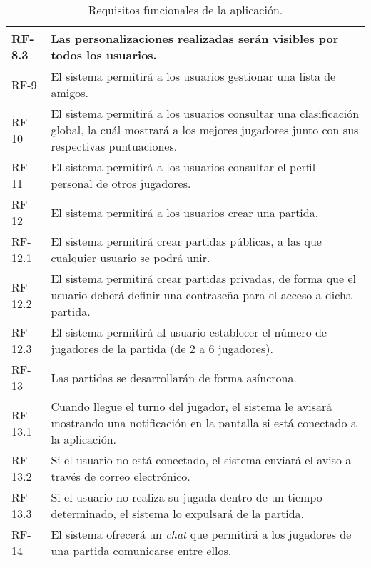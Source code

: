 \documentclass[11pt, a4paper, titlepage]{article}
\begin{document}
\begin{table}[h!]
\begin{tabularx}{\textwidth}{|l|X|}
         \hline
         RF-8.3 & Las personalizaciones realizadas serán visibles por todos los usuarios.\\
         \hline
         RF-9 & El sistema permitirá a los usuarios gestionar una lista de amigos.\\
         \hline
         RF-10 & El sistema permitirá a los usuarios consultar una clasificación global, la cuál mostrará a los mejores jugadores junto con sus respectivas puntuaciones.\\
         \hline
         RF-11 & El sistema permitirá a los usuarios consultar el perfil personal de otros jugadores.\\
         \hline
         RF-12 & El sistema permitirá a los usuarios crear una partida.\\
         \hline
         RF-12.1 & El sistema permitirá crear partidas públicas, a las que cualquier usuario se podrá unir.\\
         \hline
         RF-12.2 & El sistema permitirá crear partidas privadas, de forma que el usuario deberá definir una contraseña para el acceso a dicha partida.\\
         \hline
         RF-12.3 & El sistema permitirá al usuario establecer el número de jugadores de la partida (de 2 a 6 jugadores).\\
         \hline
         RF-13 & Las partidas se desarrollarán de forma asíncrona.\\
         \hline
         RF-13.1 & Cuando llegue el turno del jugador, el sistema le avisará mostrando una notificación en la pantalla si está conectado a la aplicación.\\
         \hline
         RF-13.2 & Si el usuario no está conectado, el sistema enviará el aviso a través de correo electrónico.\\
         \hline
         RF-13.3 & Si el usuario no realiza su jugada dentro de un tiempo determinado, el sistema lo expulsará de la partida.\\
         \hline
         RF-14 & El sistema ofrecerá un \textit{chat} que permitirá a los jugadores de una partida comunicarse entre ellos.\\
         \hline
    \end{tabularx}
    \caption{Requisitos funcionales de la aplicación.}
    \label{tab:rf}
\end{table}
\end{document}
